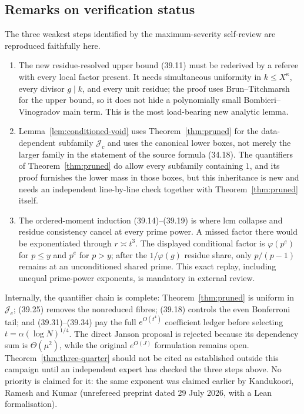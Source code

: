 \documentclass[10pt,reqno]{amsart}
\theoremstyle{definition}
\newcommand{\1}{\mathbf 1}
\begin{document}
\subsection{Remarks on verification status}\label{sec:verification-remarks}
The three weakest steps identified by the maximum-severity self-review are
reproduced faithfully here.
\begin{enumerate}[leftmargin=*]
\item The new residue-resolved upper bound (39.11) must be rederived by a
referee with every local factor present.  It needs simultaneous uniformity
in $k\leq X^\kappa$, every divisor $g\mid k$, and every unit residue; the
proof uses Brun--Titchmarsh for the upper bound, so it does not hide a
polynomially small Bombieri--Vinogradov main term.  This is the most
load-bearing new analytic lemma.
\item Lemma~\ref{lem:conditioned-void} uses Theorem~\ref{thm:pruned} for the
data-dependent subfamily $\mathcal J_c$ and uses the canonical lower boxes,
not merely the larger family in the statement of the source formula
(34.18).  The quantifiers of Theorem~\ref{thm:pruned} do allow every
subfamily containing $1$, and its proof furnishes the lower mass in those
boxes, but this inheritance is new and needs an independent line-by-line
check together with Theorem~\ref{thm:pruned} itself.
\item The ordered-moment induction (39.14)--(39.19) is where lcm collapse
and residue consistency cancel at every prime power.  A missed factor there
would be exponentiated through $r\asymp t^3$.  The displayed conditional
factor is $\varphi(p^e)$ for $p\leq y$ and $p^e$ for $p>y$; after the
$1/\varphi(g)$ residue share, only $p/(p-1)$ remains at an unconditioned
shared prime.  This exact replay, including unequal prime-power exponents,
is mandatory in external review.
\end{enumerate}

Internally, the quantifier chain is complete: Theorem~\ref{thm:pruned} is
uniform in $\mathcal J_c$; (39.25) removes the nonreduced fibres; (39.18)
controls the even Bonferroni tail; and (39.31)--(39.34) pay the full
$e^{O(t^4)}$ coefficient ledger before selecting
$t=\alpha(\log N)^{1/4}$.  The direct Janson proposal is rejected because
its dependency sum is $\Theta(\mu^2)$, while the original $e^{O(J)}$
formulation remains open.  Theorem~\ref{thm:three-quarter} should not be
cited as established outside this campaign until an independent expert has
checked the three steps above.  No priority is claimed for it: the same
exponent was claimed earlier by Kandukoori, Ramesh and Kumar
\cite[Thm.~1]{KRK} (unrefereed preprint dated 29 July 2026, with a Lean
formalisation).
\end{document}
